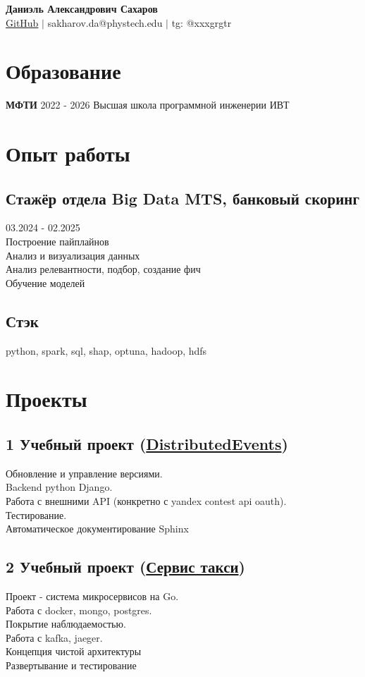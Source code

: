\documentclass[a4paper,10pt]{article}
\begin{document}
\begin{center}
    \textbf{\LARGE Даниэль Александрович Сахаров} \\
    \vspace{5pt}
    \href{https://github.com/grgtr}{GitHub} $\vert$
    sakharov.da@phystech.edu $\vert$ 
    tg: @xxxgrgtr
\end{center}

\section*{Образование}
\noindent
\textbf{МФТИ} \hfill 2022 - 2026
Высшая школа программной инженерии ИВТ

\section*{Опыт работы}
\noindent
\subsection*{Стажёр отдела Big Data MTS, банковый скоринг}
03.2024 - 02.2025 \\
Построение пайплайнов \\
Анализ и визуализация данных \\
Анализ релевантности, подбор, создание фич \\
Обучение моделей
\subsection*{Стэк}
python, spark, sql, shap, optuna, hadoop, hdfs

\section*{Проекты}
\noindent
\subsection*{1 Учебный проект (\href{https://github.com/hsse-distributed-events-team/devents-second-semester}{DistributedEvents})}
Обновление и управление версиями. \\
Backend python Django. \\
Работа с внешними API (конкретно с yandex contest api oauth). \\
Тестирование. \\
Автоматическое документирование Sphinx

\subsection*{2 Учебный проект (\href{https://github.com/VS-CDR/final-project_hsse}{Сервис такси})}
Проект - система микросервисов на Go. \\
Работа с docker, mongo, postgres. \\
Покрытие наблюдаемостью. \\
Работа с kafka, jaeger. \\
Концепция чистой архитектуры \\
Развертывание и тестирование
\end{document}
